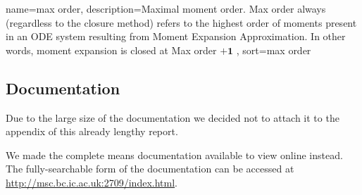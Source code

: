 \documentclass[11pt,a4paper]{article}
\begin{document}
\tableofcontents


{
  name=max order,
  description={Maximal moment order. Max order always (regardless to the closure method) refers to the highest order of 
  moments present in an ODE system resulting from Moment Expansion Approximation. In other words, moment expansion is closed at Max order $\mathbf{+1}$
   },
  sort=max order
}
\newpage{}
\printglossaries

\newpage{}

\newpage

\newpage{}

\newpage{}

\newpage{}

\newpage{}
{}


\newpage{}
\begin{appendices}
\section{Documentation}
\label{sec:documentation}

Due to the large size of the documentation we decided not to attach it to the appendix of this already lengthy report.

We made the complete means documentation available to view online instead. The fully-searchable form of the documentation can be accessed at \\
\url{http://msc.bc.ic.ac.uk:2709/index.html}.

\end{appendices}
   
\end{document}
